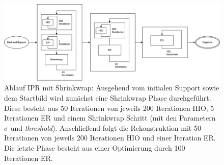 \begin{figure}
	\centering
	\includegraphics[width=1\textwidth]{images/flow_sw.pdf}
	\caption[Ablauf IPR mit Shrinkwrap]{Ablauf IPR mit Shrinkwrap: Ausgehend vom initialen Support sowie dem Startbild wird zunächst eine Shrinkwrap Phase durchgeführt. Diese besteht aus 50 Iterationen von jeweils 200 Iterationen HIO, 5 Iterationen ER und einem Shrinkwrap Schritt (mit den Parametern \textit{$\sigma$} und \textit{threshold}). Anschließend folgt die Rekonstruktion mit 50 Iterationen von jeweils 200 Iterationen HIO und einer Iteration ER. Die letzte Phase besteht aus einer Optimierung durch 100 Iterationen ER.}
	\label{fig:flow_sw}
\end{figure} 

